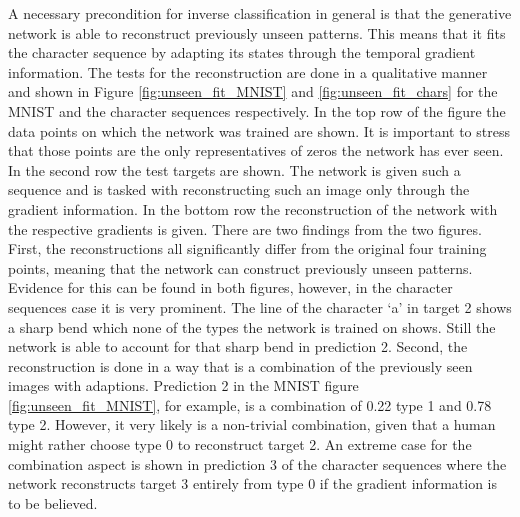 \documentclass{article}
\begin{document}
A necessary precondition for inverse classification in general is that the generative network is able to reconstruct previously unseen patterns. This means that it fits the character sequence by adapting its states through the temporal gradient information. The tests for the reconstruction are done in a qualitative manner and shown in Figure \ref{fig:unseen_fit_MNIST} and \ref{fig:unseen_fit_chars} for the MNIST and the character sequences respectively. In the top row of the figure the data points on which the network was trained are shown. It is important to stress that those points are the only representatives of zeros the network has ever seen. In the second row the test targets are shown. The network is given such a sequence and is tasked with reconstructing such an image only through the gradient information. In the bottom row the reconstruction of the network with the respective gradients is given. There are two findings from the two figures. First, the reconstructions all significantly differ from the original four training points, meaning that the network can construct previously unseen patterns. Evidence for this can be found in both figures, however, in the character sequences case it is very prominent. The line of the character `a' in target 2 shows a sharp bend which none of the types the network is trained on shows. Still the network is able to account for that sharp bend in prediction 2. Second, the reconstruction is done in a way that is a combination of the previously seen images with adaptions. Prediction 2 in the MNIST figure \ref{fig:unseen_fit_MNIST}, for example, is a combination of 0.22 type 1 and 0.78 type 2. However, it very likely is a non-trivial combination, given that a human might rather choose type 0 to reconstruct target 2. An extreme case for the combination aspect is shown in prediction 3 of the character sequences where the network reconstructs target 3 entirely from type 0 if the gradient information is to be believed. 
\end{document}
